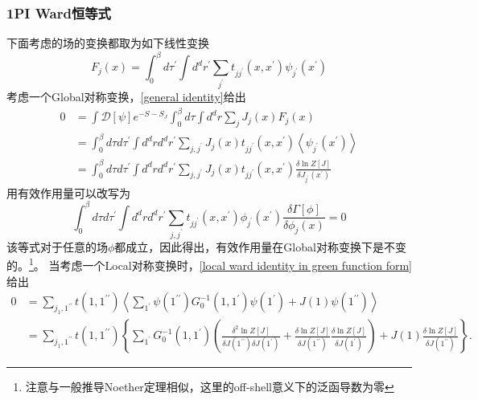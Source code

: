 \documentclass[10pt,openany]{book}
\theoremstyle{thmstyle} %
\theoremstyle{defstyle} %
\theoremstyle{prostyle} %
\begin{document}
\subsubsection{1PI Ward恒等式}
下面考虑的场的变换都取为如下线性变换
\begin{equation*}
  F_j(x)=\int_0^\beta d \tau^{\prime} \int d^d r^{\prime} \sum_{j^{\prime}} t_{j j^{\prime}}\left(x, x^{\prime}\right) \psi_{j^{\prime}}\left(x^{\prime}\right)
\end{equation*}
考虑一个Global对称变换，\eqref{general identity}给出
\begin{equation}
  \begin{aligned}
0 & =\int \mathcal{D}[\psi] e^{-S-S_J} \int_0^\beta d \tau \int d^d r \sum_j J_j(x) F_j(x) \\
& =\int_0^\beta d \tau d \tau^{\prime} \int d^d r d^d r^{\prime} \sum_{j, j^{\prime}} J_j(x) t_{j j^{\prime}}\left(x, x^{\prime}\right)\left\langle\psi_{j^{\prime}}\left(x^{\prime}\right)\right\rangle \\
& =\int_0^\beta d \tau d \tau^{\prime} \int d^d r d^d r^{\prime} \sum_{j, j^{\prime}} J_j(x) t_{j j^{\prime}}\left(x, x^{\prime}\right) \frac{\delta \ln Z[J]}{\delta J_{j^{\prime}}\left(x^{\prime}\right)}
\end{aligned}
\end{equation}
用有效作用量可以改写为
\begin{equation}
  \int_0^\beta d \tau d \tau^{\prime} \int d^d r d^d r^{\prime} \sum_{j, j^{\prime}} t_{j j^{\prime}}\left(x, x^{\prime}\right) \phi_{j^{\prime}}\left(x^{\prime}\right) \frac{\delta \Gamma[\phi]}{\delta \phi_j(x)}=0
\end{equation}
该等式对于任意的场$ \phi $都成立，因此得出，有效作用量在Global对称变换下是不变的。\footnote{注意与一般推导Noether定理相似，这里的off-shell意义下的泛函导数为零}。
当考虑一个Local对称变换时，\eqref{local ward identity in green function form}给出
\begin{equation}
  \begin{aligned}
0 & =\sum_{j_1, 1^{\prime \prime}} t\left(1,1^{\prime \prime}\right)\left\langle\sum_{1^{\prime}} \psi\left(1^{\prime \prime}\right) G_0^{-1}\left(1,1^{\prime}\right) \psi\left(1^{\prime}\right)+J(1) \psi\left(1^{\prime \prime}\right)\right\rangle \\
& =\sum_{j_1, 1^{\prime \prime}} t\left(1,1^{\prime \prime}\right)\left\{\sum_{1^{\prime}} G_0^{-1}\left(1,1^{\prime}\right)\left(\frac{\delta^2 \ln Z[J]}{\delta J\left(1^{\prime \prime}\right) \delta J\left(1^{\prime}\right)}+\frac{\delta \ln Z[J]}{\delta J\left(1^{\prime \prime}\right)} \frac{\delta \ln Z[J]}{\delta J\left(1^{\prime}\right)}\right)+J(1) \frac{\delta \ln Z[J]}{\delta J\left(1^{\prime \prime}\right)}\right\} .
\end{aligned}
\end{equation}
\end{document}
